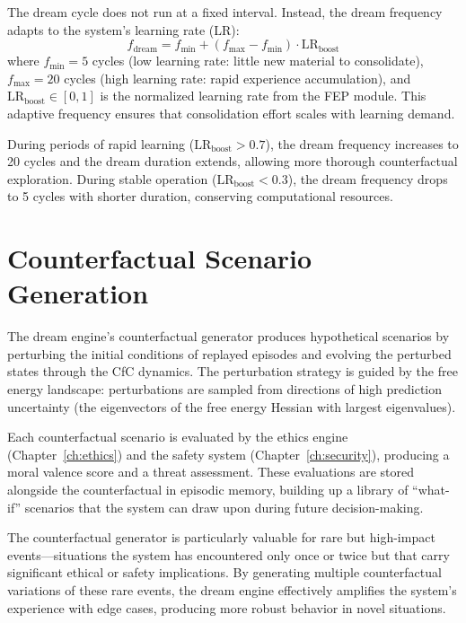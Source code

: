 \documentclass[12pt]{book}
\begin{document}
The dream cycle does not run at a fixed interval. Instead, the dream frequency adapts to the system's learning rate (LR):
\begin{equation}
f_{\text{dream}} = f_{\min} + (f_{\max} - f_{\min}) \cdot \text{LR}_{\text{boost}}
\end{equation}
where $f_{\min} = 5$ cycles (low learning rate: little new material to consolidate), $f_{\max} = 20$ cycles (high learning rate: rapid experience accumulation), and $\text{LR}_{\text{boost}} \in [0,1]$ is the normalized learning rate from the FEP module. This adaptive frequency ensures that consolidation effort scales with learning demand.

During periods of rapid learning ($\text{LR}_{\text{boost}} > 0.7$), the dream frequency increases to 20 cycles and the dream duration extends, allowing more thorough counterfactual exploration. During stable operation ($\text{LR}_{\text{boost}} < 0.3$), the dream frequency drops to 5 cycles with shorter duration, conserving computational resources.

\section{Counterfactual Scenario Generation}

The dream engine's counterfactual generator produces hypothetical scenarios by perturbing the initial conditions of replayed episodes and evolving the perturbed states through the CfC dynamics. The perturbation strategy is guided by the free energy landscape: perturbations are sampled from directions of high prediction uncertainty (the eigenvectors of the free energy Hessian with largest eigenvalues).

Each counterfactual scenario is evaluated by the ethics engine (Chapter~\ref{ch:ethics}) and the safety system (Chapter~\ref{ch:security}), producing a moral valence score and a threat assessment. These evaluations are stored alongside the counterfactual in episodic memory, building up a library of ``what-if'' scenarios that the system can draw upon during future decision-making.

The counterfactual generator is particularly valuable for rare but high-impact events---situations the system has encountered only once or twice but that carry significant ethical or safety implications. By generating multiple counterfactual variations of these rare events, the dream engine effectively amplifies the system's experience with edge cases, producing more robust behavior in novel situations.
\end{document}
